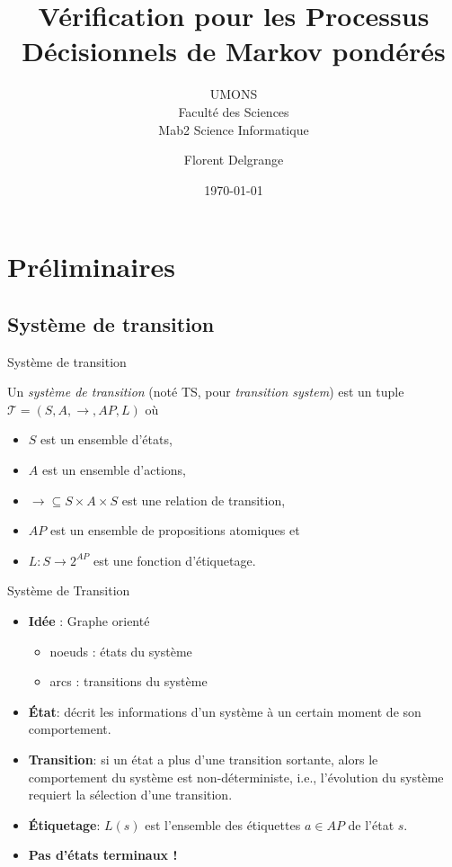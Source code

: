 \documentclass[compress]{beamer}
\title{Vérification pour les Processus Décisionnels de Markov pondérés
} %
\author{Florent Delgrange}
\subtitle{\normalsize UMONS \\ Faculté des Sciences \\ Mab2 Science Informatique}
\date{\today}
\begin{document}
  \begin{frame}[plain]
    \maketitle
  \end{frame}


\section{Préliminaires}
\subsection{Système de transition}
\begin{frame}{Système de transition}
\begin{definition}
Un \textit{système de transition} (noté TS, pour \textit{transition system}) est un tuple $\mathcal{T} = (S, A, \rightarrow, AP, L)$ où
\begin{itemize}
  \item $S$ est un ensemble d'états,
  \item $A$ est un ensemble d'actions,
  \item $\rightarrow \subseteq S \times A \times S$ est une relation de transition,
  \item $AP$ est un ensemble de propositions atomiques et
  \item $L: S \rightarrow 2^{AP}$ est une fonction d'étiquetage.
\end{itemize}
\end{definition}
\end{frame}

\begin{frame}{Système de Transition}
  \begin{itemize}
    \item \textbf{\color{fibeamer@orange}Idée} : Graphe orienté
      \begin{itemize}
        \item noeuds : états du système
        \item arcs : transitions du système
      \end{itemize}
    \item \textbf{\color{fibeamer@orange}\'Etat}: décrit les informations d'un système à un certain moment de son comportement.
    \item \textbf{\color{fibeamer@orange}Transition}: si un état a plus d'une transition sortante, alors le comportement du système est \alert {non-déterministe}, i.e., l'évolution du système requiert la sélection d'une transition.
    \item \textbf{\color{fibeamer@orange}\'Etiquetage}: $L(s)$ est l'ensemble des étiquettes $a \in AP$ de l'état $s$.
    \item \textbf{\color{fibeamer@orange}Pas d'états terminaux !}
  \end{itemize}
\end{frame}
\end{document}
